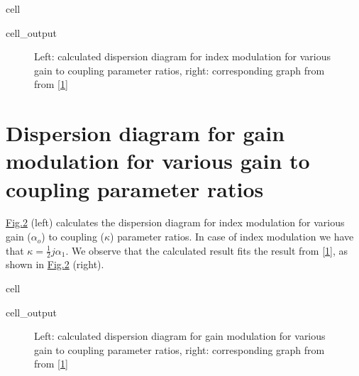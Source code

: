 \documentclass[a4paper,10pt,english,openany,oneside]{jupyterBook}
\begin{document}
\begin{sphinxuseclass}{cell}\begin{sphinxVerbatimOutput}

\begin{sphinxuseclass}{cell_output}
\begin{figure}[htbp]
\centering
\capstart

\noindent{}
\caption{Left: calculated dispersion diagram for index modulation for various gain to coupling parameter ratios, right: corresponding graph from from {[}\hyperlink{cite.bib:id3}{1}{]}}\label{\detokenize{Kogelnik-Shank_Coupled-Wave-Theory_DFB-Lasers:kogelnik1}}\end{figure}

\end{sphinxuseclass}\end{sphinxVerbatimOutput}

\end{sphinxuseclass}

\section{Dispersion diagram for gain modulation for various gain to coupling parameter ratios}
\label{\detokenize{Kogelnik-Shank_Coupled-Wave-Theory_DFB-Lasers:dispersion-diagram-for-gain-modulation-for-various-gain-to-coupling-parameter-ratios}}
\sphinxAtStartPar
\hyperref[\detokenize{Kogelnik-Shank_Coupled-Wave-Theory_DFB-Lasers:kogelnik3}]{Fig.\@ \ref{\detokenize{Kogelnik-Shank_Coupled-Wave-Theory_DFB-Lasers:kogelnik3}}} (left) calculates the dispersion diagram for index modulation for various gain (\(\alpha_o\)) to coupling (\(\kappa\)) parameter ratios. In case of index modulation we have that \(\kappa= \frac{1}{2} j \alpha_1\). We observe that the calculated result fits the result from {[}\hyperlink{cite.bib:id3}{1}{]}, as shown in \hyperref[\detokenize{Kogelnik-Shank_Coupled-Wave-Theory_DFB-Lasers:kogelnik3}]{Fig.\@ \ref{\detokenize{Kogelnik-Shank_Coupled-Wave-Theory_DFB-Lasers:kogelnik3}}} (right).

\begin{sphinxuseclass}{cell}\begin{sphinxVerbatimOutput}

\begin{sphinxuseclass}{cell_output}
\begin{figure}[htbp]
\centering
\capstart

\noindent{}
\caption{Left: calculated dispersion diagram for gain modulation for various gain to coupling parameter ratios, right: corresponding graph from from {[}\hyperlink{cite.bib:id3}{1}{]}}\label{\detokenize{Kogelnik-Shank_Coupled-Wave-Theory_DFB-Lasers:kogelnik3}}\end{figure}

\end{sphinxuseclass}\end{sphinxVerbatimOutput}

\end{sphinxuseclass}
\end{document}
